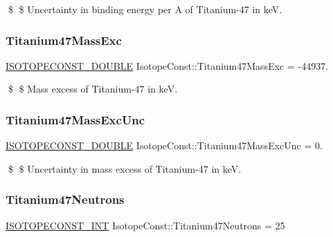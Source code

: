 \$ \$ Uncertainty in binding energy per A of Titanium-\/47 in keV. \mbox{\label{group___isotope_const-_titanium-_ti47_ga6be4515adbde6772e2348bed0486747d}} 
\subsubsection{\texorpdfstring{Titanium47\+Mass\+Exc}{Titanium47MassExc}}
{\footnotesize\ttfamily \mbox{\hyperlink{group___isotope_const-_macros_ga8f45a7272ce02c0b4c65c44636ed719a}{I\+S\+O\+T\+O\+P\+E\+C\+O\+N\+S\+T\+\_\+\+D\+O\+U\+B\+LE}} Isotope\+Const\+::\+Titanium47\+Mass\+Exc = -\/44937.}

\$ \$ Mass excess of Titanium-\/47 in keV. \mbox{\label{group___isotope_const-_titanium-_ti47_gacce52625868726a7d434812f0b3177d0}} 
\subsubsection{\texorpdfstring{Titanium47\+Mass\+Exc\+Unc}{Titanium47MassExcUnc}}
{\footnotesize\ttfamily \mbox{\hyperlink{group___isotope_const-_macros_ga8f45a7272ce02c0b4c65c44636ed719a}{I\+S\+O\+T\+O\+P\+E\+C\+O\+N\+S\+T\+\_\+\+D\+O\+U\+B\+LE}} Isotope\+Const\+::\+Titanium47\+Mass\+Exc\+Unc = 0.}

\$ \$ Uncertainty in mass excess of Titanium-\/47 in keV. \mbox{\label{group___isotope_const-_titanium-_ti47_ga0802466937a5255ebe11105ea5799ef0}} 
\subsubsection{\texorpdfstring{Titanium47\+Neutrons}{Titanium47Neutrons}}
{\footnotesize\ttfamily \mbox{\hyperlink{group___isotope_const-_macros_ga5f18360b3e99483a35c32d789e62621c}{I\+S\+O\+T\+O\+P\+E\+C\+O\+N\+S\+T\+\_\+\+I\+NT}} Isotope\+Const\+::\+Titanium47\+Neutrons = 25}

